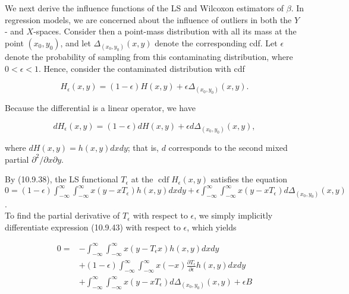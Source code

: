 We next derive the influence functions of the LS and Wilcoxon estimators of $\beta$. In regression models, we are concerned about the influence of outliers in both the $Y$ - and $X$-spaces. Consider then a point-mass distribution with all its mass at the point $\left(x_{0}, y_{0}\right)$, and let $\Delta_{\left(x_{0}, y_{0}\right)}(x, y)$ denote the corresponding cdf. Let $\epsilon$ denote the probability of sampling from this contaminating distribution, where $0<\epsilon<1$. Hence, consider the contaminated distribution with cdf


\begin{equation*}
H_{\epsilon}(x, y)=(1-\epsilon) H(x, y)+\epsilon \Delta_{\left(x_{0}, y_{0}\right)}(x, y) . \tag{10.9.41}
\end{equation*}


Because the differential is a linear operator, we have


\begin{equation*}
d H_{\epsilon}(x, y)=(1-\epsilon) d H(x, y)+\epsilon d \Delta_{\left(x_{0}, y_{0}\right)}(x, y), \tag{10.9.42}
\end{equation*}


where $d H(x, y)=h(x, y) d x d y$; that is, $d$ corresponds to the second mixed partial $\partial^{2} / \partial x \partial y$.

By (10.9.38), the LS functional $T_{\epsilon}$ at the $\operatorname{cdf} H_{\epsilon}(x, y)$ satisfies the equation\\
$0=(1-\epsilon) \int_{-\infty}^{\infty} \int_{-\infty}^{\infty} x\left(y-x T_{\epsilon}\right) h(x, y) d x d y+\epsilon \int_{-\infty}^{\infty} \int_{-\infty}^{\infty} x\left(y-x T_{\epsilon}\right) d \Delta_{\left(x_{0}, y_{0}\right)}(x, y)$.\\
To find the partial derivative of $T_{\epsilon}$ with respect to $\epsilon$, we simply implicitly differentiate expression (10.9.43) with respect to $\epsilon$, which yields


\begin{align*}
0= & -\int_{-\infty}^{\infty} \int_{-\infty}^{\infty} x\left(y-T_{\epsilon} x\right) h(x, y) d x d y \\
& +(1-\epsilon) \int_{-\infty}^{\infty} \int_{-\infty}^{\infty} x(-x) \frac{\partial T_{\epsilon}}{\partial \epsilon} h(x, y) d x d y \\
& +\int_{-\infty}^{\infty} \int_{-\infty}^{\infty} x\left(y-x T_{\epsilon}\right) d \Delta_{\left(x_{0}, y_{0}\right)}(x, y)+\epsilon B \tag{10.9.44}
\end{align*}


